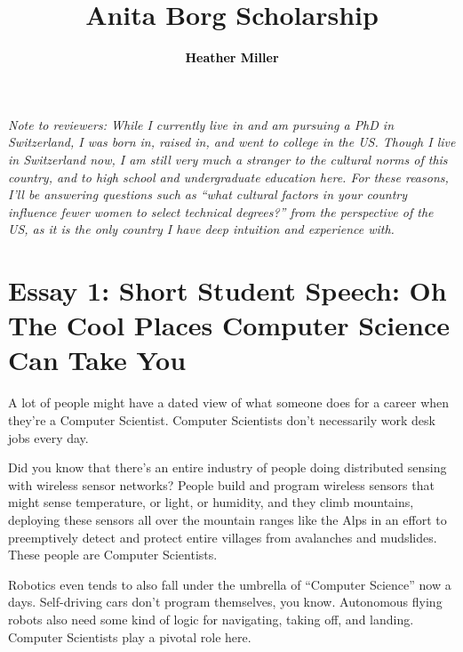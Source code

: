 \documentclass[acmtocl]{acmtrans2m}
\title{{\color{Black}Anita Borg Scholarship}}
\author{\textcolor{Black}{\textbf{Heather Miller}}}
\begin{document}
\setmonofont[Mapping=tex-text,Scale=0.9]{Inconsolata}
%
\maketitle

{\em Note to reviewers: While I currently live in and am pursuing a PhD in
Switzerland, I was born in, raised in, and went to college in the US. Though I
live in Switzerland now, I am still very much a stranger to the cultural norms
of this country, and to high school and undergraduate education here. For
these reasons, I'll be answering questions such as ``what cultural factors in
your country influence fewer women to select technical degrees?'' from the
perspective of the US, as it is the only country I have deep intuition and
experience with.}

\vspace{-0.1in}

\section*{\textbf{Essay 1:} Short Student Speech: Oh The Cool Places Computer Science Can Take You}


A lot of people might have a dated view of what someone does for a career when
they're a Computer Scientist. Computer Scientists don't necessarily work desk
jobs every day.

Did you know that there's an entire industry of people doing distributed
sensing with wireless sensor networks? People build and program wireless
sensors that might sense temperature, or light, or humidity, and they climb
mountains, deploying these sensors all over the mountain ranges like the Alps
in an effort to preemptively detect and protect entire villages from
avalanches and mudslides. These people are Computer Scientists.

Robotics even tends to also fall under the umbrella of ``Computer Science''
now a days. Self-driving cars don't program themselves, you know. Autonomous
flying robots also need some kind of logic for navigating, taking off, and
landing. Computer Scientists play a pivotal role here.
\end{document}
